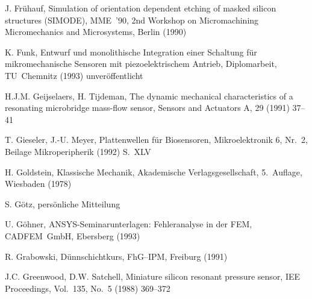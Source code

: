 \begin{thebibliography}{xxx}

 J. Frühauf, Simulation of orientation dependent etching of masked silicon
 structures ({\sf SIMODE}), MME~'90, 2nd Workshop on Micromachining
 Micromechanics and Microsystems, Berlin (1990)

 K. Funk, Entwurf und monolithische Integration einer Schaltung für
 mikromechanische Sensoren mit piezoelektrischem Antrieb, Diplomarbeit,
 TU~Chemnitz (1993) unveröffentlicht



 H.J.M. Geijselaers, H. Tijdeman, The dynamic mechanical characteristics of
 a resonating microbridge mass-flow sensor, Sensors and Actuators A, 29
 (1991) 37--41



 T. Gieseler, J.-U. Meyer, Plattenwellen für Biosensoren, Mikroelektronik 6,
 Nr.~2, Beilage Mikroperipherik (1992) S.~XLV

 H. Goldstein, Klassische Mechanik, Akademische Verlagsgesellschaft,
 5.~Auflage, Wiesbaden (1978)

 S. Götz, persönliche Mitteilung

 U. Göhner, {\sf ANSYS}-Seminarunterlagen: Fehleranalyse in der FEM,
 CADFEM~GmbH, Ebersberg (1993)

 R. Grabowski, Dünnschichtkurs, FhG--IPM, Freiburg (1991)

 J.C. Greenwood, D.W. Satchell, Miniature silicon resonant pressure sensor,
 IEE Proceedings, Vol.~135, No.~5 (1988) 369--372


\end{thebibliography}
